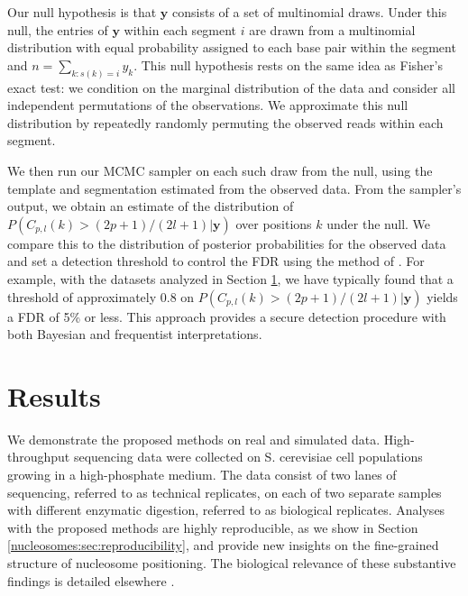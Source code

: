 Our null hypothesis is that $\bm y$ consists of a set of multinomial draws.
Under this null, the entries of $\bm y$ within each segment $i$ are drawn from a multinomial distribution with equal probability assigned to each base pair within the segment and $n = \sum_{k : s(k) = i} y_{k}$.
This null hypothesis rests on the same idea as Fisher's exact test: we condition on the marginal distribution of the data and consider all independent permutations of the observations. 
We approximate this null distribution by repeatedly randomly permuting the observed reads within each segment.

We then run our MCMC sampler on each such draw from the null, using the template and segmentation estimated from the observed data.
From the sampler's output, we obtain an estimate of the distribution of $P(C_{p,l}(k) > (2p+1) / (2l+1) | \bm y)$ over positions $k$ under the null.
We compare this to the distribution of posterior probabilities for the observed data and set a detection threshold to control the FDR using the method of \citet{StoreyTibshirani2003}.
For example, with the datasets analyzed in Section \ref{nucleosomes:sec:results}, we have typically found that a threshold of approximately $0.8$ on $P(C_{p,l}(k) > (2p+1) / (2l+1) | \bm y)$ yields a FDR of 5\% or less.
This approach provides a secure detection procedure with both Bayesian and frequentist interpretations.


\section{Results}
\label{nucleosomes:sec:results}

We demonstrate the proposed methods on  real and simulated data.
%
High-throughput sequencing data were collected on S. cerevisiae cell populations growing in a high-phosphate medium.
The data consist of two lanes of sequencing, referred to as technical replicates, on each of two separate samples with different enzymatic digestion, referred to as biological replicates.
Analyses with the proposed methods are highly reproducible, as we show in Section \ref{nucleosomes:sec:reproducibility}, and provide new insights on the fine-grained structure of nucleosome positioning.
The biological relevance of these substantive findings is detailed elsewhere \citep{Xu:Alex:Edo:Erin:2011}.

